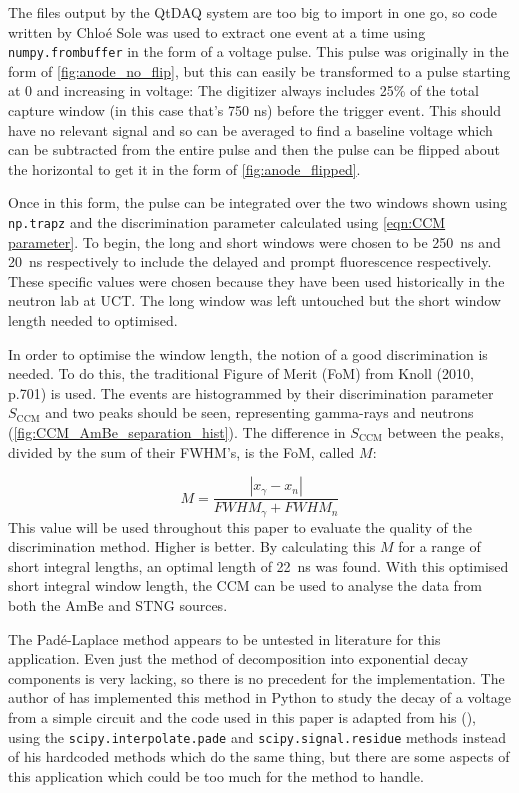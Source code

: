 \documentclass[11pt]{article}
\numberwithin{equation}{section}
\numberwithin{figure}{section}
\numberwithin{table}{section}
\begin{document}
\par The files output by the QtDAQ system are too big to import in one go, so code written by Chlo\'e Sole was used to extract one event at a time using \texttt{numpy.frombuffer} in the form of a voltage pulse. This pulse was originally in the form of \cref{fig:anode_no_flip}, but this can easily be transformed to a pulse starting at 0 and increasing in voltage: The digitizer always includes 25\% of the total capture window (in this case that's 750 ns) before the trigger event. This should have no relevant signal and so can be averaged to find a baseline voltage which can be subtracted from the entire pulse and then the pulse can be flipped about the horizontal to get it in the form of \cref{fig:anode_flipped}.
\par Once in this form, the pulse can be integrated over the two windows shown using \texttt{np.trapz} and the discrimination parameter calculated using \cref{eqn:CCM parameter}. To begin, the long and short windows were chosen to be \SI{250}{\nano\second} and \SI{20}{\nano\second} respectively to include the delayed and prompt fluorescence respectively. These specific values were chosen because they have been used historically in the neutron lab at UCT. The long window was left untouched but the short window length needed to optimised.

\par In order to optimise the window length, the notion of a good discrimination is needed. To do this, the traditional Figure of Merit (FoM) from Knoll (2010, p.701) is used. The events are histogrammed by their discrimination parameter $S_{\mathrm{CCM}}$ and two peaks should be seen, representing gamma-rays and neutrons (\cref{fig:CCM_AmBe_separation_hist}). The difference in $S_{\mathrm{CCM}}$ between the peaks, divided by the sum of their FWHM's, is the FoM, called $M$:

\begin{equation}
    M = \frac{|x_\gamma-x_n|}{FWHM_\gamma + FWHM_n}
    \label{eqn:Figure of Merit}
\end{equation}
This value will be used throughout this paper to evaluate the quality of the discrimination method. Higher is better. By calculating this $M$ for a range of short integral lengths, an optimal length of \SI{22}{\nano\second} was found. With this optimised short integral window length, the CCM can be used to analyse the data from both the AmBe and STNG sources. 

\par The Pad\'e-Laplace method appears to be untested in literature for this application. Even just the method of decomposition into exponential decay components is very lacking, so there is no precedent for the implementation. The author of \cite{Hellen-Pade} has implemented this method in Python to study the decay of a voltage from a simple circuit and the code used in this paper is adapted from his (\cite{Hellen-Code}), using the \texttt{scipy.interpolate.pade} and \texttt{scipy.signal.residue} methods instead of his hardcoded methods which do the same thing, but there are some aspects of this application which could be too much for the method to handle. 
\end{document}
